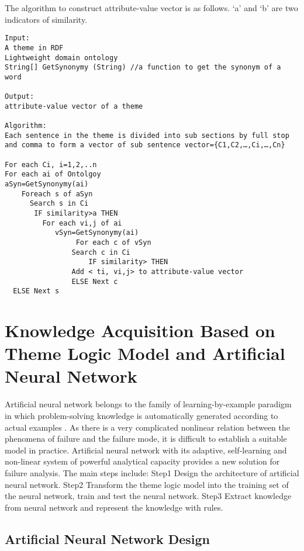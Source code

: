 \documentclass{elsarticle}
\begin{document}
The algorithm to construct attribute-value vector is as follows. ‘a’ and ‘b’ are two indicators of similarity.

\begin{verbatim}
Input: 
A theme in RDF
Lightweight domain ontology 
String[] GetSynonymy (String) //a function to get the synonym of a word

Output:
attribute-value vector of a theme

Algorithm:
Each sentence in the theme is divided into sub sections by full stop and comma to form a vector of sub sentence vector={C1,C2,…,Ci,…,Cn} 

For each Ci, i=1,2,..n 
For each ai of Ontolgoy 
aSyn=GetSynonymy(ai)
    Foreach s of aSyn
	  Search s in Ci
       IF similarity>a THEN
		 For each vi,j of ai
  			vSyn=GetSynonymy(ai)
    			 For each c of vSyn
				Search c in Ci
        			IF similarity> THEN
				Add < ti, vi,j> to attribute-value vector
			    ELSE Next c
  ELSE Next s

\end{verbatim}

\section{Knowledge Acquisition Based on Theme Logic Model and Artificial Neural Network}
\label{sec:knowl-acqu-based}

Artificial neural network belongs to the family of learning-by-example paradigm in which problem-solving knowledge is automatically generated according to actual examples \cite{hassoun1995fan}. As there is a very complicated nonlinear relation between the phenomena of failure and the failure mode, it is difficult to establish a suitable model in practice. Artificial neural network with its adaptive, self-learning and non-linear system of powerful analytical capacity provides a new solution for failure analysis. The main steps include:
Step1 Design the architecture of artificial neural network.
Step2 Transform the theme logic model into the training set of the neural network, train and test the neural network. 
Step3 Extract knowledge from neural network and represent the
knowledge with rules.

\subsection{Artificial Neural Network Design}
\label{sec:artif-neur-netw}
\end{document}
